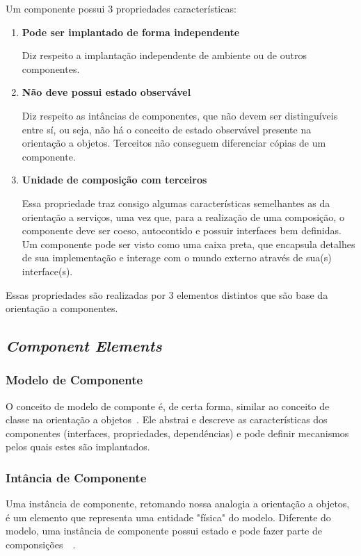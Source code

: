 Um componente possui 3 propriedades características:

\begin{enumerate}
\item \textbf{Pode ser implantado de forma independente}

Diz respeito a implantação independente de ambiente ou de outros componentes.

\item \textbf{Não deve possui estado observável}

Diz respeito as intâncias de componentes, que não devem ser distinguíveis entre sí, ou seja, não há o conceito de estado observável presente na orientação a objetos. Terceitos não conseguem diferenciar cópias de um componente.

\item \textbf{Unidade de composição com terceiros}

Essa propriedade traz consigo algumas características semelhantes as da orientação a serviços, uma vez que, para a realização de uma composição, o componente deve ser coeso, autocontido e possuir interfaces bem definidas. 
Um componente pode ser visto como uma caixa preta, que encapsula detalhes de sua implementação e interage com o mundo externo através de sua(s) interface(s).
\end{enumerate}

Essas propriedades são realizadas por 3 elementos distintos que são base da orientação a componentes.

\subsection{\textit{Component Elements}}
\label{sub:elements}

\subsubsection{Modelo de Componente}
O conceito de modelo de componte é, de certa forma, similar ao conceito de classe na orientação a objetos~\cite{cervantes2005technical}. Ele abstrai e descreve as características dos componentes (interfaces, propriedades, dependências) e pode definir mecanismos pelos quais estes são implantados.

\subsubsection{Intância de Componente}
Uma instância de componente, retomando nossa analogia a orientação a objetos, é um elemento que representa uma entidade "física" do modelo. Diferente do modelo, uma instância de componente possui estado e pode fazer parte de componsições~\cite{cervantes2005technical}~\cite{szyperski2002component}.

